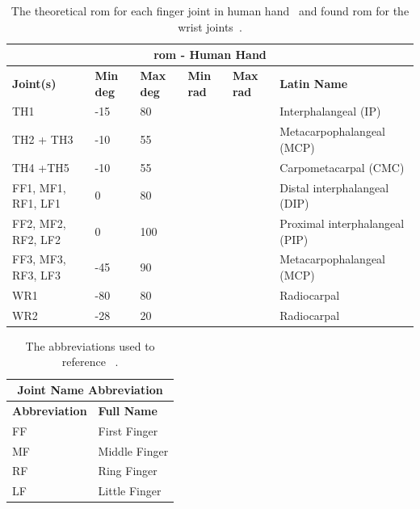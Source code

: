 \begin{table}[h]
	\begin{center}
		\begin{tabular}{ |p{}|p{}|p{}|p{}|p{}|p{}| } 
		\hline
		\multicolumn{6}{|c|}{\textbf{\gls{rom} - Human Hand}} \\ \hline
		\textbf{Joint(s)} & \textbf{Min deg} & \textbf{Max deg} & \textbf{Min rad} & \textbf{Max rad} & \textbf{Latin Name} \\ \hline
		TH1 & -15 & 80 & & & Interphalangeal (IP) \\ \hline
		TH2 + TH3 & -10 & 55 & & & Metacarpophalangeal (MCP)\\ \hline
		TH4 +TH5  & -10 & 55 & & & Carpometacarpal (CMC)\\ \hline
		FF1, MF1, RF1, LF1 & 0 & 80 & & & Distal interphalangeal (DIP) \\ \hline
		FF2, MF2, RF2, LF2 & 0 & 100 & & & Proximal interphalangeal (PIP) \\ \hline
		FF3, MF3, RF3, LF3 & -45 & 90 & & & Metacarpophalangeal (MCP) \\ \hline
		WR1 &-80&80& & & Radiocarpal \\ \hline
		WR2 &-28&20& & & Radiocarpal \\ \hline
		\end{tabular}
		\caption{The theoretical \gls{rom} for each finger joint in human hand~\cite{continuous-and-simultaneous-estimation-of-finger-kinematics-using-inputs-from-an-emg-to-muscle-activation-model} and found \gls{rom} for the wrist joints~\cite{functional-wrist-motion:-a-biomechanical-study}.}
		\label{app:range-of-motion-human-hand}
	\end{center}
\end{table}

\begin{table}[h]
	\begin{center}
		\begin{tabular}{ |l|l| } 
		\hline
		\multicolumn{2}{|c|}{\textbf{Joint Name Abbreviation}} \\ \hline
		\textbf{Abbreviation} & \textbf{Full Name} \\ \hline
		FF & First Finger \\ \hline 
		MF & Middle Finger \\ \hline 
		RF & Ring Finger \\ \hline 
		LF & Little Finger \\ \hline 
		\end{tabular}
		\caption{The abbreviations used to reference ~\cite{joint-abbreviations-shadow-hand}.}
		\label{app:joint-abbreviations}
	\end{center}
	\end{table}

